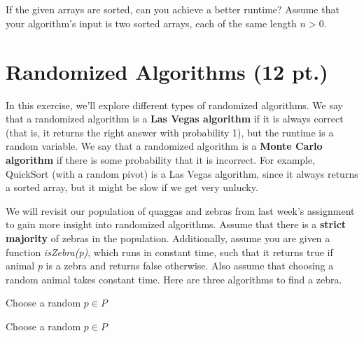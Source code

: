\documentclass[12pt]{article}
\begin{document}
    
        \subsection{} 
        If the given arrays are sorted, can you achieve a better runtime? Assume that your algorithm's input is two sorted arrays, each of the same length $n > 0$.
        
    

	\section{Randomized Algorithms (12 pt.)}
	
    In this exercise, we'll explore different types of randomized algorithms.  We say that a randomized algorithm is a \textbf{Las Vegas algorithm} if it is always correct (that is, it returns the right answer with probability 1), but the runtime is a random variable. We say that a randomized algorithm is a \textbf{Monte Carlo algorithm} if there is some probability that it is incorrect.  For example, QuickSort (with a random pivot) is a Las Vegas algorithm, since it always returns a sorted array, but it might be slow if we get very unlucky.

    We will revisit our population of quaggas and zebras from last week's assignment to gain more insight into randomized algorithms. Assume that there is a \textbf{strict majority} of zebras in the population.
    Additionally, assume you are given a function \textit{isZebra(p)}, which runs in constant time, such that it returns true if animal $p$ is a zebra and returns false otherwise.
    Also assume that choosing a random animal takes constant time.
    Here are three algorithms to find a zebra.

\begin{algorithm}[H]
{
Choose a random $p \in P$\; 
}
\caption{\textsc{findZebra1}}
\end{algorithm}

\begin{algorithm}[H]
{
Choose a random $p \in P$\;
}
\caption{\textsc{findZebra2}}
\end{algorithm}
\end{document}

